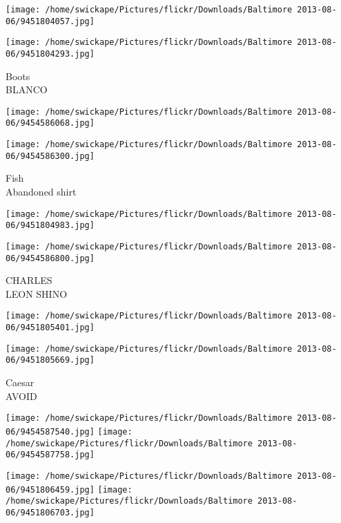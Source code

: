 \documentclass[10pt,letterpaper]{article}
\begin{document}
\texttt{[image: /home/swickape/Pictures/flickr/Downloads/Baltimore 2013-08-06/9451804057.jpg]}

\vspace{0.25in}
\texttt{[image: /home/swickape/Pictures/flickr/Downloads/Baltimore 2013-08-06/9451804293.jpg]}

Boots\\
BLANCO\\
\pagebreak

\texttt{[image: /home/swickape/Pictures/flickr/Downloads/Baltimore 2013-08-06/9454586068.jpg]}

\vspace{0.25in}
\texttt{[image: /home/swickape/Pictures/flickr/Downloads/Baltimore 2013-08-06/9454586300.jpg]}

Fish\\
Abandoned shirt\\
\pagebreak

\texttt{[image: /home/swickape/Pictures/flickr/Downloads/Baltimore 2013-08-06/9451804983.jpg]}

\vspace{0.25in}
\texttt{[image: /home/swickape/Pictures/flickr/Downloads/Baltimore 2013-08-06/9454586800.jpg]}

CHARLES\\
LEON SHINO\\
\pagebreak

\texttt{[image: /home/swickape/Pictures/flickr/Downloads/Baltimore 2013-08-06/9451805401.jpg]}

\vspace{0.25in}
\texttt{[image: /home/swickape/Pictures/flickr/Downloads/Baltimore 2013-08-06/9451805669.jpg]}

Caesar\\
AVOID\\
\pagebreak

\texttt{[image: /home/swickape/Pictures/flickr/Downloads/Baltimore 2013-08-06/9454587540.jpg]}
\texttt{[image: /home/swickape/Pictures/flickr/Downloads/Baltimore 2013-08-06/9454587758.jpg]}

\texttt{[image: /home/swickape/Pictures/flickr/Downloads/Baltimore 2013-08-06/9451806459.jpg]}
\texttt{[image: /home/swickape/Pictures/flickr/Downloads/Baltimore 2013-08-06/9451806703.jpg]}
\end{document}
